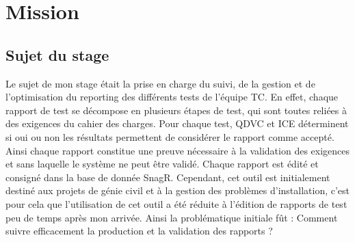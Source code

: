 \chapter{Mission}

\section{Sujet du stage}
Le sujet de mon stage était la prise en charge du suivi, de la gestion et de l'optimisation  du \gls{reporting} des différents tests de l'équipe \gls{TC}. 
En effet, chaque rapport de test se décompose en plusieurs étapes de test, qui sont toutes reliées à des exigences du cahier des charges. Pour chaque test, QDVC et ICE déterminent si oui ou non les résultats permettent de considérer le rapport comme accepté. Ainsi chaque rapport constitue une preuve nécessaire à la validation des exigences et sans laquelle le système ne peut être validé. 
Chaque rapport est édité et consigné dans la base de donnée \gls{SnagR}. 
Cependant, cet outil est initialement destiné aux projets de génie civil et à la gestion des problèmes d'installation, c'est pour cela que l'utilisation de cet outil a été réduite à l'édition de rapports de test peu de temps après mon arrivée.
Ainsi la problématique initiale fût : Comment suivre efficacement la production et la validation des rapports ?


